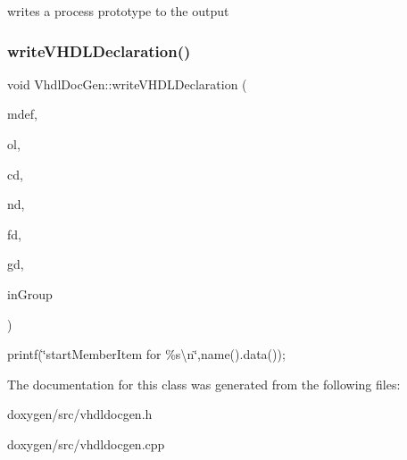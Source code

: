 writes a process prototype to the output \mbox{\label{class_vhdl_doc_gen_ac5c7235e2572f9dab6475d5af835e437}} 
\subsubsection{\texorpdfstring{writeVHDLDeclaration()}{writeVHDLDeclaration()}}
{\footnotesize\ttfamily void Vhdl\+Doc\+Gen\+::write\+V\+H\+D\+L\+Declaration (\begin{DoxyParamCaption}\item[{\mbox{\hyperlink{class_member_def}{Member\+Def}} $\ast$}]{mdef,  }\item[{\mbox{\hyperlink{class_output_list}{Output\+List}} \&}]{ol,  }\item[{\mbox{\hyperlink{class_class_def}{Class\+Def}} $\ast$}]{cd,  }\item[{\mbox{\hyperlink{class_namespace_def}{Namespace\+Def}} $\ast$}]{nd,  }\item[{\mbox{\hyperlink{class_file_def}{File\+Def}} $\ast$}]{fd,  }\item[{\mbox{\hyperlink{class_group_def}{Group\+Def}} $\ast$}]{gd,  }\item[{bool}]{in\+Group }\end{DoxyParamCaption})\hspace{0.3cm}{\ttfamily [static]}}

printf(\char`\"{}start\+Member\+Item for \%s\textbackslash{}n\char`\"{},name().data());

The documentation for this class was generated from the following files\+:\begin{DoxyCompactItemize}
\item 
doxygen/src/vhdldocgen.\+h\item 
doxygen/src/vhdldocgen.\+cpp\end{DoxyCompactItemize}
